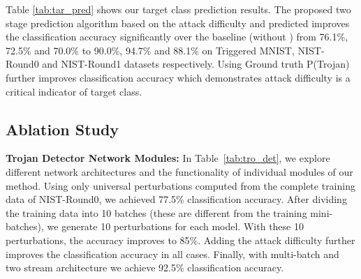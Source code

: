 \documentclass{article}
\begin{document}
Table \ref{tab:tar_pred} shows our target class prediction results. The proposed two stage prediction algorithm based on the attack difficulty and predicted  improves the classification accuracy significantly over the baseline (without ) from 76.1\%, 72.5\% and 70.0\% to 90.0\%, 94.7\% and 88.1\% on Triggered MNIST, NIST-Round0 and NIST-Round1 datasets respectively. Using Ground truth P(Trojan) further improves classification accuracy which demonstrates attack difficulty is a critical indicator of target class.















 
\subsection{Ablation Study}
\vspace{-2mm}

{\bf Trojan Detector Network Modules:}
In Table~\ref{tab:tro_det}, we explore different network architectures and the functionality of individual modules of our method. Using only universal perturbations computed from the complete training data of NIST-Round0, we achieved 77.5\% classification accuracy. After dividing the training data into 10 batches (these are different from the training mini-batches), we generate 10 perturbations for each model. With these 10 perturbations, the accuracy improves to 85\%. Adding the attack difficulty further improves the classification accuracy in all cases. Finally, with multi-batch and two stream architecture we achieve 92.5\% classification accuracy. 
\end{document}

